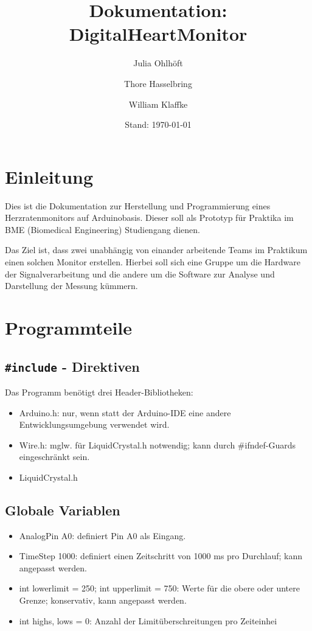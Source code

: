 \documentclass[10pt, a4paper]{article}
\title{Dokumentation: DigitalHeartMonitor}
\author[1]{Julia Ohlhöft}
\author[1]{Thore Hasselbring}
\author[1]{William Klaffke}
\affil[1]{TH Lübeck}
\date{Stand: \today}
\begin{document}
\maketitle

\tableofcontents

\section{Einleitung}
Dies ist die Dokumentation zur Herstellung und Programmierung eines Herzratenmonitors auf Arduinobasis. Dieser soll als Prototyp für Praktika im BME (Biomedical Engineering) Studiengang dienen.

Das Ziel ist, dass zwei unabhängig von einander arbeitende Teams im Praktikum einen solchen Monitor erstellen. Hierbei soll sich eine Gruppe um die Hardware der Signalverarbeitung und die andere um die Software zur Analyse und Darstellung der Messung kümmern.

\section{Programmteile}

\subsection{\texttt{\#include} - Direktiven}
Das Programm benötigt drei Header-Bibliotheken:
\begin{itemize}
	\item Arduino.h: nur, wenn statt der Arduino-IDE eine andere Entwicklungsumgebung verwendet wird.
	\item Wire.h: mglw. für LiquidCrystal.h notwendig; kann durch \#ifndef-Guards eingeschränkt sein.
	\item LiquidCrystal.h
\end{itemize}	

\subsection{Globale Variablen}
\begin{itemize}
	\item AnalogPin A0: definiert Pin A0 als Eingang.
	\item TimeStep 1000: definiert einen Zeitschritt von 1000 ms pro Durchlauf; kann angepasst werden.
	\item int lowerlimit = 250; int upperlimit = 750: Werte für die obere oder untere Grenze; konservativ, kann angepasst werden.
	\item int highs, lows = 0: Anzahl der Limitüberschreitungen pro Zeiteinhei
\end{itemize}
\end{document}

